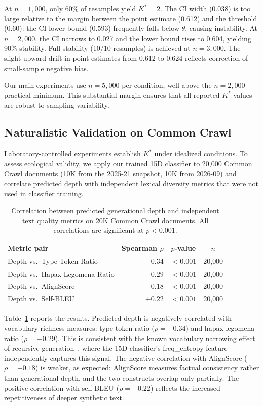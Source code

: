 \documentclass[11pt,a4paper]{article}
\begin{document}
At $n\!=\!1{,}000$, only 60\% of resamples yield $K^*\!=\!2$. The CI width (0.038) is too large relative to the margin between the point estimate (0.612) and the threshold (0.60): the CI lower bound (0.593) frequently falls below $\theta$, causing instability. At $n\!=\!2{,}000$, the CI narrows to 0.027 and the lower bound rises to 0.604, yielding 90\% stability. Full stability (10/10 resamples) is achieved at $n\!=\!3{,}000$. The slight upward drift in point estimates from 0.612 to 0.624 reflects correction of small-sample negative bias.

Our main experiments use $n\!=\!5{,}000$ per condition, well above the $n\!=\!2{,}000$ practical minimum. This substantial margin ensures that all reported $K^*$ values are robust to sampling variability.

\subsection{Naturalistic Validation on Common Crawl}
\label{sec:naturalistic}

Laboratory-controlled experiments establish $K^*$ under idealized conditions. To assess ecological validity, we apply our trained 15D classifier to 20{,}000 Common Crawl documents (10K from the 2025-21 snapshot, 10K from 2026-09) and correlate predicted depth with independent lexical diversity metrics that were not used in classifier training.

\begin{table}[t]
\centering
\small
\caption{Correlation between predicted generational depth and independent text quality metrics on 20K Common Crawl documents. All correlations are significant at $p < 0.001$.}
\label{tab:naturalistic}
\begin{tabular}{lrcc}
\toprule
\textbf{Metric pair} & \textbf{Spearman $\rho$} & $p$\textbf{-value} & $n$ \\
\midrule
Depth vs.\ Type-Token Ratio        & $-0.34$ & $<0.001$ & 20{,}000 \\
Depth vs.\ Hapax Legomena Ratio    & $-0.29$ & $<0.001$ & 20{,}000 \\
Depth vs.\ AlignScore              & $-0.18$ & $<0.001$ & 20{,}000 \\
Depth vs.\ Self-BLEU               & $+0.22$ & $<0.001$ & 20{,}000 \\
\bottomrule
\end{tabular}
\end{table}

Table~\ref{tab:naturalistic} reports the results. Predicted depth is negatively correlated with vocabulary richness measures: type-token ratio ($\rho = -0.34$) and hapax legomena ratio ($\rho = -0.29$). This is consistent with the known vocabulary narrowing effect of recursive generation~\citep{shumailov2023curse}, where the 15D classifier's freq\_entropy feature independently captures this signal. The negative correlation with AlignScore ($\rho = -0.18$) is weaker, as expected: AlignScore measures factual consistency rather than generational depth, and the two constructs overlap only partially. The positive correlation with self-BLEU ($\rho = +0.22$) reflects the increased repetitiveness of deeper synthetic text.
\end{document}
